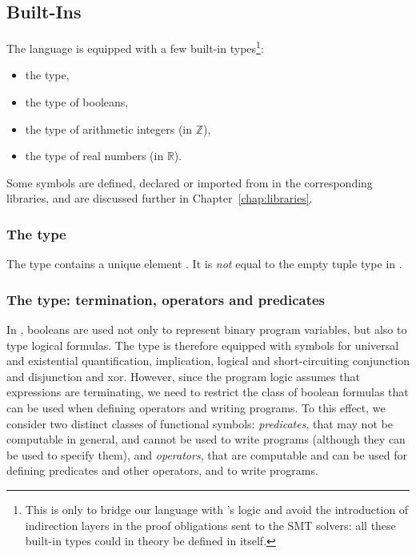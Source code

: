 \subsection{Built-Ins}
The language is equipped with a few built-in types\footnote{This is only to
bridge our language with \WhyThree's logic and avoid the introduction of
indirection layers in the proof obligations sent to the SMT solvers: all these
built-in types could in theory be defined in \EC itself.}:
\begin{itemize}
\item the  type,
\item the  type of booleans,
\item the  type of arithmetic integers (in $\mathbb{Z}$),
\item the  type of real numbers (in $\mathbb{R}$).
\end{itemize}

Some symbols are defined, declared or imported from \WhyThree in the
corresponding libraries, and are discussed further in
Chapter~\ref{chap:libraries}.

\subsubsection*{The  type}
The  type contains a unique element . It is \emph{not}
equal to the empty tuple type in \EC.

\subsubsection*{The  type: termination, operators and predicates}
In \EC, booleans are used not only to represent binary program variables, but
also to type logical formulas. The  type is therefore equipped with
symbols for universal and existential quantification, implication, logical and
short-circuiting conjunction and disjunction and xor. However, since the program
logic assumes that expressions are terminating, we need to restrict the class of
boolean formulas that can be used when defining operators and writing programs.
To this effect, we consider two distinct classes of functional symbols:
\emph{predicates}, that may not be computable in general, and cannot be used to
write programs (although they can be used to specify them), and
\emph{operators}, that are computable and can be used for defining predicates
and other operators, and to write programs.

